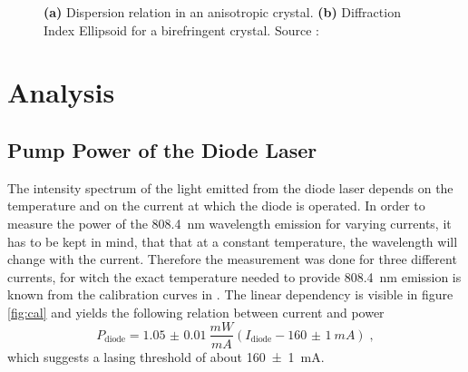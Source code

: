 \documentclass[a4paper]{scrartcl}
\numberwithin{equation}{section}
\numberwithin{figure}{section}
\numberwithin{table}{section}
\newcommand{\eq}[2]{\begin{equation}#1\label{#2}\end{equation}}
\begin{document}
\begin{figure}
\centering
{}
\hfill
{}
\caption{\small \textbf{(a)} Dispersion relation in an anisotropic crystal. \textbf{(b)} Diffraction Index Ellipsoid for a birefringent crystal. Source : \cite{dickel}}
\label{fig:nonlinearofoptics}
\end{figure}

\section{Analysis}
\subsection{Pump Power of the Diode Laser}
The intensity spectrum of the light emitted from the diode laser depends on the temperature and on the current at which the diode is operated. In order to measure the power of the \SI{808.4}{nm} wavelength emission for varying currents, it has to be kept in mind, that that at a constant temperature, the wavelength will change with the current. Therefore the measurement was done for three different currents, for witch the exact temperature needed to provide \SI{808.4}{nm} emission is known from the calibration curves in \cite{script}. The linear dependency  is visible in figure \ref{fig:cal} and yields the following relation between current and power
\eq{P_\text{diode}=\SI{1.05(1)}{\frac{mW}{mA}}\left(I_\text{diode}-\SI{160(1)}{mA} \right) \;, }{cal}
which suggests a lasing threshold of about \SI{160(1)}{mA}. 
\end{document}
